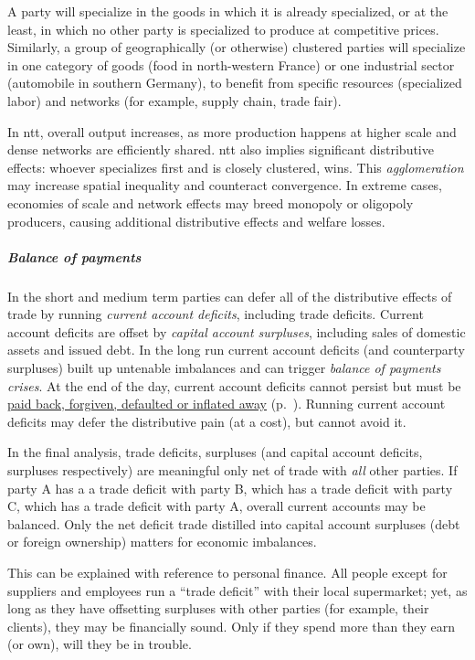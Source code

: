 \begin{description}
	A party will specialize in the goods in which it is already specialized, or at the least, in which no other party is specialized to produce at competitive prices.
	Similarly, a group of geographically (or otherwise) clustered parties will specialize in one category of goods (food in north-western France) or one industrial sector (automobile in southern Germany), to benefit from specific resources (specialized labor) and networks (for example, supply chain, trade fair).

	In \gls{ntt}, overall output increases, as more production happens at higher scale and dense networks are efficiently shared.
	\gls{ntt} also implies significant distributive effects:
	whoever specializes first and is closely clustered, wins.
	This \emph{agglomeration} may increase spatial inequality and counteract convergence.
	In extreme cases, economies of scale and network effects may breed monopoly or oligopoly producers, causing additional distributive effects and welfare losses.
\end{description}

\subparagraph{Balance of payments}
In the short and medium term parties can defer all of the distributive effects of trade by running \emph{current account deficits}, including trade deficits.
Current account deficits are offset by \emph{capital account surpluses}, including sales of domestic assets and issued debt.
In the long run current account deficits (and counterparty surpluses) built up untenable imbalances and can trigger \emph{balance of payments crises}.
At the end of the day, current account deficits cannot persist but must be \hyperref[sec:imbalances]{paid back, forgiven, defaulted or inflated away} (p.~\pageref{sec:imbalances}).
Running current account deficits may defer the distributive pain (at a cost), but cannot avoid it.

In the final analysis, trade deficits, surpluses (and capital account deficits, surpluses respectively) are meaningful only net of trade with \emph{all} other parties.
If party A has a a trade deficit with party B, which has a trade deficit with party C, which has a trade deficit with party A, overall current accounts may be balanced.
Only the net deficit trade distilled into capital account surpluses (debt or foreign ownership) matters for economic imbalances.

This can be explained with reference to personal finance.
All people except for suppliers and employees run a ``trade deficit'' with their local supermarket;
yet, as long as they have offsetting surpluses with other parties (for example, their clients), they may be financially sound.
Only if they spend more than they earn (or own), will they be in trouble.%

